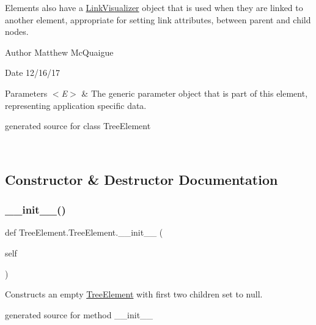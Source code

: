 Elements also have a \hyperlink{namespace_link_visualizer}{Link\+Visualizer} object that is used when they are linked to another element, appropriate for setting link attributes, between parent and child nodes.

\begin{DoxyAuthor}{Author}
Matthew Mc\+Quaigue
\end{DoxyAuthor}
\begin{DoxyDate}{Date}
12/16/17
\end{DoxyDate}

\begin{DoxyParams}{Parameters}
{\em $<$\+E$>$} & The generic parameter object that is part of this element, representing application specific data. \begin{DoxyVerb}generated source for class TreeElement \end{DoxyVerb}
 \\
\hline
\end{DoxyParams}


\subsection{Constructor \& Destructor Documentation}
\hypertarget{class_tree_element_1_1_tree_element_ab58d73eaa251245c300b2ef98f6df82e}{}\label{class_tree_element_1_1_tree_element_ab58d73eaa251245c300b2ef98f6df82e} 
\subsubsection{\texorpdfstring{\+\_\+\+\_\+init\+\_\+\+\_\+()}{\_\_init\_\_()}}
{\footnotesize\ttfamily def Tree\+Element.\+Tree\+Element.\+\_\+\+\_\+init\+\_\+\+\_\+ (\begin{DoxyParamCaption}\item[{}]{self }\end{DoxyParamCaption})}



Constructs an empty \hyperlink{class_tree_element_1_1_tree_element}{Tree\+Element} with first two children set to null. 

\begin{DoxyVerb}generated source for method __init__ \end{DoxyVerb}
 

